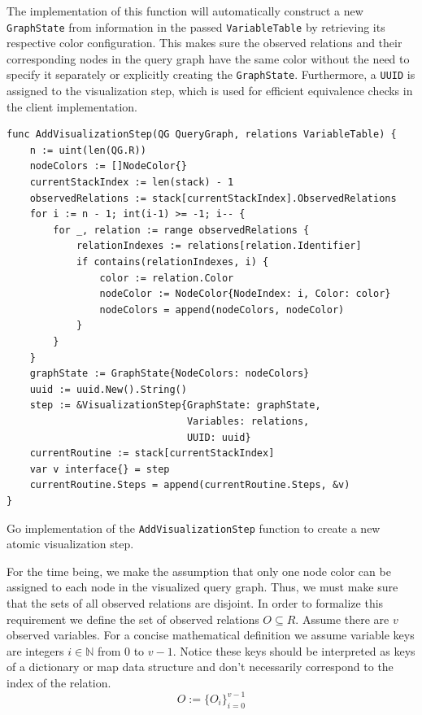 The implementation of this function will automatically construct a new \texttt{GraphState} from information in the passed \texttt{VariableTable} by retrieving its respective color configuration. This makes sure the observed relations and their corresponding nodes in the query graph have the same color without the need to specify it separately or explicitly creating the \texttt{GraphState}. Furthermore, a \texttt{UUID} is assigned to the visualization step, which is used for efficient equivalence checks in the client implementation.

\begin{fullwidth}[width=\textwidth + 0.5cm,leftmargin=-2.5cm]
\begin{algorithm}[H]
\begin{verbatim}
func AddVisualizationStep(QG QueryGraph, relations VariableTable) {
    n := uint(len(QG.R))
    nodeColors := []NodeColor{}
    currentStackIndex := len(stack) - 1
    observedRelations := stack[currentStackIndex].ObservedRelations
    for i := n - 1; int(i-1) >= -1; i-- {
        for _, relation := range observedRelations {
            relationIndexes := relations[relation.Identifier]
            if contains(relationIndexes, i) {
                color := relation.Color
                nodeColor := NodeColor{NodeIndex: i, Color: color}
                nodeColors = append(nodeColors, nodeColor)
            }
        }
    }
    graphState := GraphState{NodeColors: nodeColors}
    uuid := uuid.New().String()
    step := &VisualizationStep{GraphState: graphState, 
                               Variables: relations, 
                               UUID: uuid}
    currentRoutine := stack[currentStackIndex]
    var v interface{} = step
    currentRoutine.Steps = append(currentRoutine.Steps, &v)
}
\end{verbatim}
\caption{Go implementation of the \texttt{AddVisualizationStep} function to create a new atomic visualization step.}
\end{algorithm}
\end{fullwidth}

\begin{note}
For the time being, we make the assumption that only one node color can be assigned to each node in the visualized query graph. Thus, we must make sure that the sets of all observed relations are disjoint. In order to formalize this requirement we define the set of observed relations $O \subseteq R$. Assume there are $v$ observed variables. For a concise mathematical definition we assume variable keys are integers $i \in \mathbb{N}$ from 0 to $v-1$. Notice these keys should be interpreted as keys of a dictionary or map data structure and don't necessarily correspond to the index of the relation.
\begin{equation}
O := \{O_i\}_{i=0}^{v-1}
\end{equation}
\end{note}

